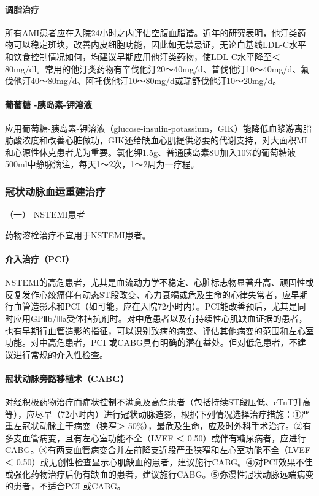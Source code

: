 \paragraph{调脂治疗}

所有AMI患者应在入院24小时之内评估空腹血脂谱。近年的研究表明，他汀类药物可以稳定斑块，改善内皮细胞功能，因此如无禁忌证，无论血基线LDL-C水平和饮食控制情况如何，均建议早期应用他汀类药物，使LDL-C水平降至＜
80mg/dl。常用的他汀类药物有辛伐他汀20～40mg/d、普伐他汀10～40mg/d、氟伐他汀40～80mg/d、阿托伐他汀10～80mg/d或瑞舒伐他汀10～20mg/d。

\paragraph{葡萄糖 -胰岛素-钾溶液}

应用葡萄糖-胰岛素-钾溶液（glucose-insulin-potassium，GIK）能降低血浆游离脂肪酸浓度和改善心脏做功，GIK还给缺血心肌提供必要的代谢支持，对大面积MI和心源性休克患者尤为重要。氯化钾1.5g、普通胰岛素8U加入10\%的葡萄糖液500ml中静脉滴注，每天1～2次，1～2周为一疗程。

\subsubsection{冠状动脉血运重建治疗}

\hypertarget{text00312.htmlux5cux23CHP10-8-2-3-4-1}{}
（一） NSTEMI患者

药物溶栓治疗不宜用于NSTEMI患者。

\paragraph{介入治疗（PCI）}

NSTEMI的高危患者，尤其是血流动力学不稳定、心脏标志物显著升高、顽固性或反复发作心绞痛伴有动态ST段改变、心力衰竭或危及生命的心律失常者，应早期行血管造影术和PCI（如可能，应在入院72小时内）。PCI能改善预后，尤其是同时应用GPⅡb/Ⅲa受体拮抗剂时。对中危患者以及有持续性心肌缺血证据的患者，也有早期行血管造影的指征，可以识别致病的病变、评估其他病变的范围和左心室功能。对中高危患者，PCI
或CABG具有明确的潜在益处。但对低危患者，不建议进行常规的介入性检查。

\paragraph{冠状动脉旁路移植术（CABG）}

对经积极药物治疗而症状控制不满意及高危患者（包括持续ST段压低、cTnT升高等），应尽早（72小时内）进行冠状动脉造影，根据下列情况选择治疗措施：①严重左冠状动脉主干病变（狭窄＞
50\%），最危及生命，应及时外科手术治疗。②有多支血管病变，且有左心室功能不全（LVEF
＜
0.50）或伴有糖尿病者，应进行CABG。③有两支血管病变合并左前降支近段严重狭窄和左心室功能不全（LVEF
＜
0.50）或无创性检查显示心肌缺血的患者，建议施行CABG。④对PCI效果不佳或强化药物治疗后仍有缺血的患者，建议施行CABG。⑤弥漫性冠状动脉远端病变的患者，不适合PCI
或CABG。

